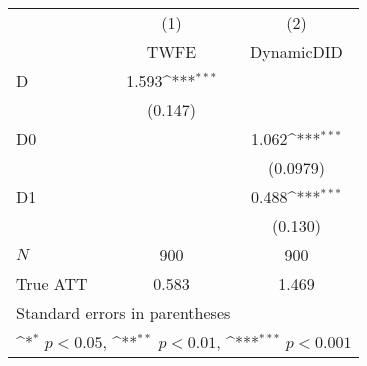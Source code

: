 {
\def\sym#1{\ifmmode^{#1}\else\(^{#1}\)\fi}
\begin{tabular}{l*{2}{c}}
\hline\hline
            &\multicolumn{1}{c}{(1)}&\multicolumn{1}{c}{(2)}\\
            &\multicolumn{1}{c}{TWFE}&\multicolumn{1}{c}{DynamicDID}\\
\hline
D           &       1.593\sym{***}&                     \\
            &     (0.147)         &                     \\
[1em]
D0          &                     &       1.062\sym{***}\\
            &                     &    (0.0979)         \\
[1em]
D1          &                     &       0.488\sym{***}\\
            &                     &     (0.130)         \\
\hline
\(N\)       &         900         &         900         \\
True ATT    &       0.583         &       1.469         \\
\hline\hline
\multicolumn{3}{l}{\footnotesize Standard errors in parentheses}\\
\multicolumn{3}{l}{\footnotesize \sym{*} \(p<0.05\), \sym{**} \(p<0.01\), \sym{***} \(p<0.001\)}\\
\end{tabular}
}
